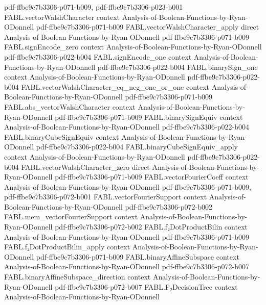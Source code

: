 \begin{theorem}
  {pdf-ffbe9c7b3306-p071-b009,
    pdf-ffbe9c7b3306-p023-b001}
\proofstep
  {FABL.vectorWalshCharacter}
  {context}
  {Analysis-of-Boolean-Functions-by-Ryan-ODonnell}
  {pdf-ffbe9c7b3306-p071-b009}
\proofstep
  {FABL.vectorWalshCharacter_apply}
  {direct}
  {Analysis-of-Boolean-Functions-by-Ryan-ODonnell}
  {pdf-ffbe9c7b3306-p071-b009}
\proofstep
  {FABL.signEncode_zero}
  {context}
  {Analysis-of-Boolean-Functions-by-Ryan-ODonnell}
  {pdf-ffbe9c7b3306-p022-b004}
\proofstep
  {FABL.signEncode_one}
  {context}
  {Analysis-of-Boolean-Functions-by-Ryan-ODonnell}
  {pdf-ffbe9c7b3306-p022-b004}
\proofstep
  {FABL.binarySign_one}
  {context}
  {Analysis-of-Boolean-Functions-by-Ryan-ODonnell}
  {pdf-ffbe9c7b3306-p022-b004}
\proofstep
  {FABL.vectorWalshCharacter_eq_neg_one_or_one}
  {context}
  {Analysis-of-Boolean-Functions-by-Ryan-ODonnell}
  {pdf-ffbe9c7b3306-p071-b009}
\proofstep
  {FABL.abs_vectorWalshCharacter}
  {context}
  {Analysis-of-Boolean-Functions-by-Ryan-ODonnell}
  {pdf-ffbe9c7b3306-p071-b009}
\proofstep
  {FABL.binarySignEquiv}
  {context}
  {Analysis-of-Boolean-Functions-by-Ryan-ODonnell}
  {pdf-ffbe9c7b3306-p022-b004}
\proofstep
  {FABL.binaryCubeSignEquiv}
  {context}
  {Analysis-of-Boolean-Functions-by-Ryan-ODonnell}
  {pdf-ffbe9c7b3306-p022-b004}
\proofstep
  {FABL.binaryCubeSignEquiv_apply}
  {context}
  {Analysis-of-Boolean-Functions-by-Ryan-ODonnell}
  {pdf-ffbe9c7b3306-p022-b004}
\proofstep
  {FABL.vectorWalshCharacter_zero}
  {direct}
  {Analysis-of-Boolean-Functions-by-Ryan-ODonnell}
  {pdf-ffbe9c7b3306-p071-b009}
\proofstep
  {FABL.vectorFourierCoeff}
  {context}
  {Analysis-of-Boolean-Functions-by-Ryan-ODonnell}
  {pdf-ffbe9c7b3306-p071-b009,
    pdf-ffbe9c7b3306-p072-b001}
\proofstep
  {FABL.vectorFourierSupport}
  {context}
  {Analysis-of-Boolean-Functions-by-Ryan-ODonnell}
  {pdf-ffbe9c7b3306-p072-b002}
\proofstep
  {FABL.mem_vectorFourierSupport}
  {context}
  {Analysis-of-Boolean-Functions-by-Ryan-ODonnell}
  {pdf-ffbe9c7b3306-p072-b002}
\proofstep
  {FABL.f₂DotProductBilin}
  {context}
  {Analysis-of-Boolean-Functions-by-Ryan-ODonnell}
  {pdf-ffbe9c7b3306-p071-b009}
\proofstep
  {FABL.f₂DotProductBilin_apply}
  {context}
  {Analysis-of-Boolean-Functions-by-Ryan-ODonnell}
  {pdf-ffbe9c7b3306-p071-b009}
\proofstep
  {FABL.binaryAffineSubspace}
  {context}
  {Analysis-of-Boolean-Functions-by-Ryan-ODonnell}
  {pdf-ffbe9c7b3306-p072-b007}
\proofstep
  {FABL.binaryAffineSubspace_direction}
  {context}
  {Analysis-of-Boolean-Functions-by-Ryan-ODonnell}
  {pdf-ffbe9c7b3306-p072-b007}
\proofstep
  {FABL.F₂DecisionTree}
  {context}
  {Analysis-of-Boolean-Functions-by-Ryan-ODonnell}

\end{theorem}
